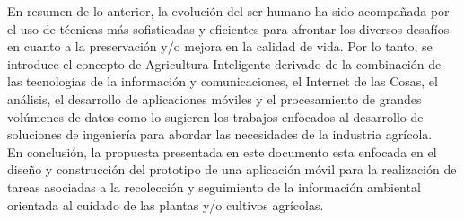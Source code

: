 \noindent En resumen de lo anterior, la evoluci\'on del ser humano ha sido acompañada por el uso de t\'ecnicas m\'as sofisticadas y eficientes para afrontar los diversos desaf\'ios en cuanto a la preservaci\'on y/o mejora en la calidad de vida. Por lo tanto, se introduce el concepto de Agricultura Inteligente derivado de la combinaci\'on de las  tecnolog\'ias de la informaci\'on y comunicaciones, el Internet de las Cosas, el an\'alisis, el desarrollo de aplicaciones m\'oviles y el procesamiento de grandes vol\'umenes de datos como lo sugieren los trabajos \cite{SmartFarmingTechnologies2019}
 \cite{IoTBasedSmartAgriculture2016} \cite{IoTBasedSmartAgricultureMonitoringSystem2017} enfocados al desarrollo de soluciones de ingenier\'ia para abordar las necesidades de la industria agr\'icola.\\

\noindent En conclusi\'on, la propuesta presentada en este documento esta enfocada en el diseño y construcci\'on del prototipo de una aplicaci\'on m\'ovil para la realizaci\'on de tareas asociadas a la recolecci\'on y seguimiento de la informaci\'on ambiental orientada al cuidado de las plantas y/o cultivos agr\'icolas.



